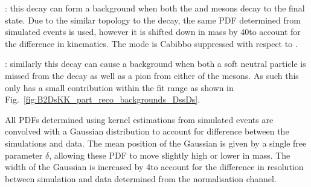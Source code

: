 
\begin{description}
\item \decay{\Bzb}{\Dsp\Dm}: this decay can form a background when both the \Dsp and \Dm mesons decay to the \Kpm\Kmp\pipm final state. Due to the similar topology to the \decay{\Bsb}{\Dsp\Dsm} decay, the same PDF determined from simulated events is used, however it is shifted down in mass by 40\mevcc to account for the difference in kinematics. The mode \decay{\Dp}{\Kp\Km\pip} is Cabibbo suppressed with respect to \decay{\Dsp}{\Kp\Km\pip}.

\item \decay{\Bsb}{\Dssp\Dsm}: similarly this decay can cause a background when both a soft neutral particle is missed from the  decay as well as a pion from either of the \Dsp mesons. As such this only has a small contribution within the fit range as shown in Fig.~\ref{fig:B2DsKK_part_reco_backgrounds_DssDs}. 
\end{description}



All PDFs determined using kernel estimations from simulated events are convolved with a Gaussian distribution to account for difference between the simulations and data. The mean position of the Gaussian is given by a single free parameter $\delta$, allowing these PDF to move slightly high or lower in mass. The width of the Gaussian is increased by 4\mevcc to account for the difference in resolution between simulation and data determined from the normalisation channel.



